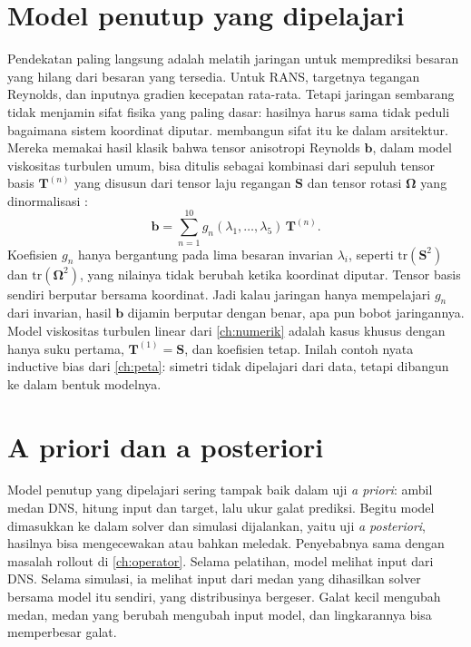 \section{Model penutup yang dipelajari}

Pendekatan paling langsung adalah melatih jaringan untuk memprediksi besaran yang hilang dari besaran
yang tersedia. Untuk RANS, targetnya tegangan Reynolds, dan inputnya gradien kecepatan rata-rata. Tetapi
jaringan sembarang tidak menjamin sifat fisika yang paling dasar: hasilnya harus sama tidak peduli
bagaimana sistem koordinat diputar. \citet{ling2016} membangun sifat itu ke dalam arsitektur. Mereka
memakai hasil klasik bahwa tensor anisotropi Reynolds $\bm b$, dalam model viskositas turbulen umum,
bisa ditulis sebagai kombinasi dari sepuluh tensor basis $\bm T^{(n)}$ yang disusun dari tensor laju
regangan $\bm S$ dan tensor rotasi $\bm\Omega$ yang dinormalisasi \citep{pope2000}:
\begin{equation}
\bm b=\sum_{n=1}^{10}g_n(\lambda_1,\dots,\lambda_5)\,\bm T^{(n)}.
\end{equation}
Koefisien $g_n$ hanya bergantung pada lima besaran invarian $\lambda_i$, seperti
$\mathrm{tr}(\bm S^2)$ dan $\mathrm{tr}(\bm\Omega^2)$, yang nilainya tidak berubah ketika koordinat
diputar. Tensor basis sendiri berputar bersama koordinat. Jadi kalau jaringan hanya mempelajari $g_n$
dari invarian, hasil $\bm b$ dijamin berputar dengan benar, apa pun bobot jaringannya. Model viskositas
turbulen linear dari \cref{ch:numerik} adalah kasus khusus dengan hanya suku pertama, $\bm T^{(1)}=\bm S$,
dan koefisien tetap. Inilah contoh nyata inductive bias dari \cref{ch:peta}: simetri tidak dipelajari dari
data, tetapi dibangun ke dalam bentuk modelnya.

\section{A priori dan a posteriori}

Model penutup yang dipelajari sering tampak baik dalam uji \emph{a priori}: ambil medan DNS,
hitung input dan target, lalu ukur galat prediksi. Begitu model dimasukkan ke dalam solver dan simulasi
dijalankan, yaitu uji \emph{a posteriori}, hasilnya bisa mengecewakan atau bahkan meledak. Penyebabnya
sama dengan masalah rollout di \cref{ch:operator}. Selama pelatihan, model melihat input dari DNS.
Selama simulasi, ia melihat input dari medan yang dihasilkan solver bersama model itu sendiri, yang
distribusinya bergeser. Galat kecil mengubah medan, medan yang berubah mengubah input model, dan
lingkarannya bisa memperbesar galat.

